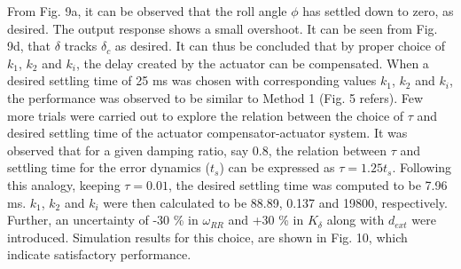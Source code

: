 \documentclass[conference]{IEEEtran}
\begin{document}
%
From Fig. 9a, it can be observed that the roll angle $\phi$ has settled down to zero, as desired. The output response shows a small overshoot. It can be seen from Fig. 9d, that $\delta$ tracks $\delta_c$ as desired. 
It can thus be concluded that by proper choice of $k_1$, $k_2$ and $k_i$, the delay created by the actuator can be compensated. When a desired settling time of 25 ms was chosen with corresponding values $k_1$, $k_2$ and $k_i$, the performance was observed to be similar to Method 1 (Fig. 5 refers).
Few more trials were carried out to explore the relation between the choice of $\tau$ and desired settling time of the actuator compensator-actuator system. It was observed that for a given damping ratio, say 0.8, the relation between $\tau$ and settling time for the error dynamics ($t_s$) can be expressed as $\tau=1.25 t_s$. Following this analogy, keeping $\tau=0.01$, the desired settling time was computed to be 7.96 ms. $k_1$, $k_2$ and $k_i$ were then calculated to be 88.89, 0.137 and 19800, respectively. Further, an uncertainty of -30 \% in $\omega_{RR}$ and +30 \% in $K_{\delta}$ along with $d_{ext}$ were introduced. Simulation results for this choice, are shown in Fig. 10, which indicate satisfactory performance.
\end{document}
